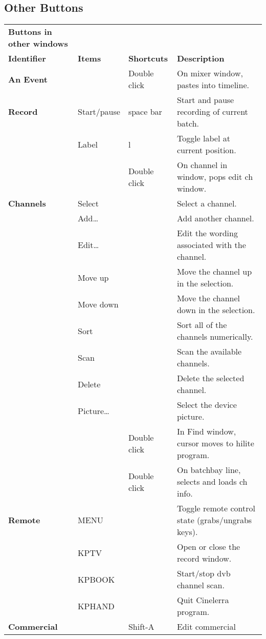 \subsection*{Other Buttons }%
\label{ssec:other_buttons}

\begin{longtable}[h]{>{\bfseries}p{}p{}p{}p{}}
  \toprule
  \multicolumn{4}{c}%
  {\textcolor{CinRed}{\textbf{Buttons in other windows}}} \\
  Identifier & \textbf{Items} & \textbf{Shortcuts} & \textbf{Description}\\
  \midrule
  \endhead
  \textcolor{CinBlueText}{An Event} &  & Double click & On mixer window, pastes into timeline. \\
  \midrule
  \textcolor{CinBlueText}{Record} & Start/pause & space bar & Start and pause recording of current batch. \\
  & Label & l & Toggle label at current position. \\
  &  & Double click & On channel in window, pops edit ch window. \\
  \midrule
  \textcolor{CinBlueText}{Channels} & Select &  & Select a channel. \\
  & Add\dots &  & Add another channel. \\
  & Edit\dots &  & Edit the wording associated with the channel. \\
  & Move up &  & Move the channel up in the selection. \\
  & Move down &  & Move the channel down in the selection. \\
  & Sort &  & Sort all of the channels numerically. \\
  & Scan &  & Scan the available channels. \\
  & Delete &  & Delete the selected channel. \\
  & Picture\dots &  & Select the device picture. \\
  &  & Double click & In Find window, cursor moves to hilite program. \\
  &  & Double click & On batchbay line, selects and loads ch info. \\
  \midrule
  \textcolor{CinBlueText}{Remote} & MENU &  & Toggle remote control state (grabs/ungrabs keys). \\
  & KPTV &  & Open or close the record window. \\
  & KPBOOK &  & Start/stop dvb channel scan. \\
  & KPHAND &  & Quit Cinelerra program. \\
  \midrule
  \textcolor{CinBlueText}{Commercial} &  & Shift-A & Edit commercial\\
  \bottomrule
\end{longtable}


